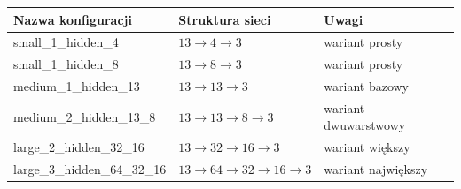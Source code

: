 \begin{tabular}{lll}
\toprule
Nazwa konfiguracji & Struktura sieci & Uwagi \\
\midrule
small\_1\_hidden\_4 & \(13 \rightarrow 4 \rightarrow 3\) & wariant prosty \\
small\_1\_hidden\_8 & \(13 \rightarrow 8 \rightarrow 3\) & wariant prosty \\
medium\_1\_hidden\_13 & \(13 \rightarrow 13 \rightarrow 3\) & wariant bazowy \\
medium\_2\_hidden\_13\_8 & \(13 \rightarrow 13 \rightarrow 8 \rightarrow 3\) & wariant dwuwarstwowy \\
large\_2\_hidden\_32\_16 & \(13 \rightarrow 32 \rightarrow 16 \rightarrow 3\) & wariant większy \\
large\_3\_hidden\_64\_32\_16 & \(13 \rightarrow 64 \rightarrow 32 \rightarrow 16 \rightarrow 3\) & wariant największy \\
\bottomrule
\end{tabular}
